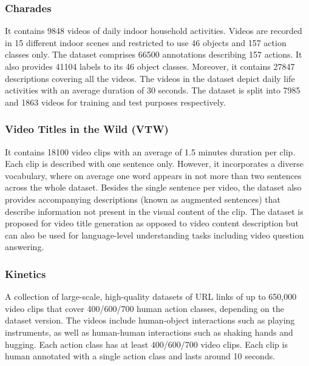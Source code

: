 \subsubsection{Charades}

\par It contains 9848 videos of daily indoor household activities. Videos are recorded in 15 different indoor scenes and restricted to use 46 objects and 157 action classes only. The dataset comprises 66500 annotations describing 157 actions. It also provides 41104 labels to its 46 object classes. Moreover, it contains 27847 descriptions covering all the videos. The videos in the dataset depict daily life activities with an average duration of 30 seconds. The dataset is split into 7985 and 1863 videos for training and test purposes respectively.

\subsubsection{Video Titles in the Wild (VTW)}

\par It contains 18100 video clips with an average of 1.5 minutes duration per clip. Each clip is described with one sentence only. However, it incorporates a diverse vocabulary, where on average one word appears in not more than two sentences across the whole dataset. Besides the single sentence per video, the dataset also provides accompanying descriptions (known as augmented sentences) that describe information not present in the visual content of the clip. The dataset is proposed for video title generation as opposed to video content description but can also be used for language-level understanding tasks including video question answering. 

\subsubsection{Kinetics}

\par A collection of large-scale, high-quality datasets of URL links of up to 650,000 video clips that cover 400/600/700 human action classes, depending on the dataset version. The videos include human-object interactions such as playing instruments, as well as human-human interactions such as shaking hands and hugging. Each action class has at least 400/600/700 video clips. Each clip is human annotated with a single action class and lasts around 10 seconds.


